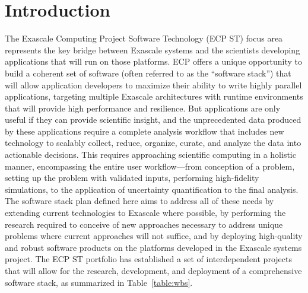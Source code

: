 \section{Introduction}
The Exascale Computing Project Software Technology (ECP ST) focus area represents the key bridge between Exascale systems and the scientists developing applications that will run on those platforms. ECP offers a unique opportunity to build a coherent set of software (often referred to as the ``software stack'') that will allow application developers to maximize their ability to write highly parallel applications, targeting multiple Exascale architectures with runtime environments that will provide high performance and resilience. But applications are only useful if they can provide scientific insight, and the unprecedented data produced by these applications require a complete analysis workflow that includes new technology to scalably collect, reduce, organize, curate, and analyze the data into actionable decisions. This requires approaching scientific computing in a holistic manner, encompassing the entire user workflow—from conception of a problem, setting up the problem with validated inputs, performing high-fidelity simulations, to the application of uncertainty quantification to the final analysis. The software stack plan defined here aims to address all of these needs by extending current technologies to Exascale where possible, by performing the research required to conceive of new approaches necessary to address unique problems where current approaches will not suffice, and by deploying high-quality and robust software products on the platforms developed in the Exascale systems project.
The ECP ST portfolio has established a set of interdependent projects that will allow for the research, development, and deployment of a comprehensive software stack, as summarized in Table~\ref{table:wbs}.

